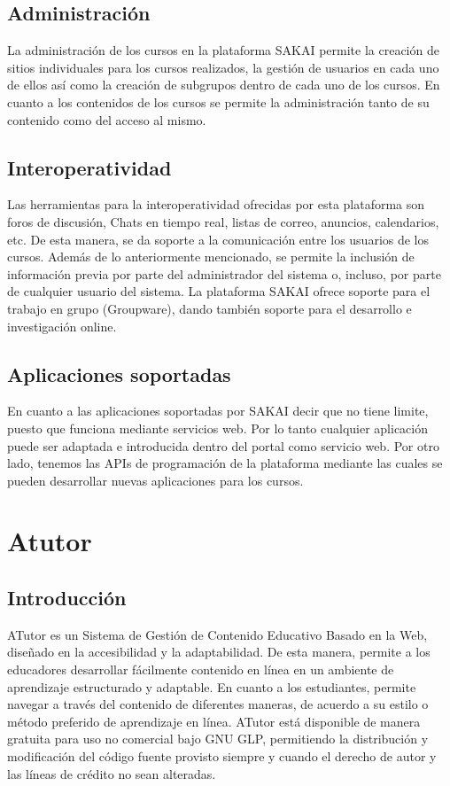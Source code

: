\subsection{Administración}

La administración de los cursos en la plataforma SAKAI permite la creación de sitios individuales para los cursos realizados, la gestión de usuarios en cada uno de ellos así como la creación de subgrupos dentro de cada uno de los cursos. En cuanto a los contenidos de los cursos se permite la administración tanto de su contenido como del acceso al mismo.

\subsection{Interoperatividad}

Las herramientas para la interoperatividad ofrecidas por esta plataforma son foros de discusión, Chats en tiempo real, listas de correo, anuncios, calendarios, etc. De esta manera, se da soporte a la comunicación entre los usuarios de los cursos. Además de lo anteriormente mencionado, se permite la inclusión de información previa por parte del administrador del sistema o, incluso, por parte de cualquier usuario del sistema. La plataforma SAKAI ofrece soporte para el trabajo en grupo (Groupware), dando también soporte para el desarrollo e investigación online.

\subsection{Aplicaciones soportadas}

En cuanto a las aplicaciones soportadas por SAKAI decir que no tiene limite, puesto que funciona mediante servicios web. Por lo tanto cualquier aplicación puede ser adaptada e introducida dentro del portal como servicio web. Por otro lado, tenemos las APIs de programación de la plataforma mediante las cuales se pueden desarrollar nuevas aplicaciones para los cursos.

\section{Atutor}

\subsection{Introducción}

ATutor\cite{atutor} es un Sistema de Gestión de Contenido Educativo Basado en la Web, diseñado en la accesibilidad y la adaptabilidad. De esta manera, permite a los educadores desarrollar fácilmente contenido en línea en un ambiente de aprendizaje estructurado y adaptable. En cuanto a los estudiantes, permite navegar a través del contenido de diferentes maneras, de acuerdo a su estilo o método preferido de aprendizaje en línea. ATutor está disponible de manera gratuita para uso no comercial bajo GNU GLP, permitiendo la distribución y modificación del código fuente provisto siempre y cuando el derecho de autor y las líneas de crédito no sean alteradas.

